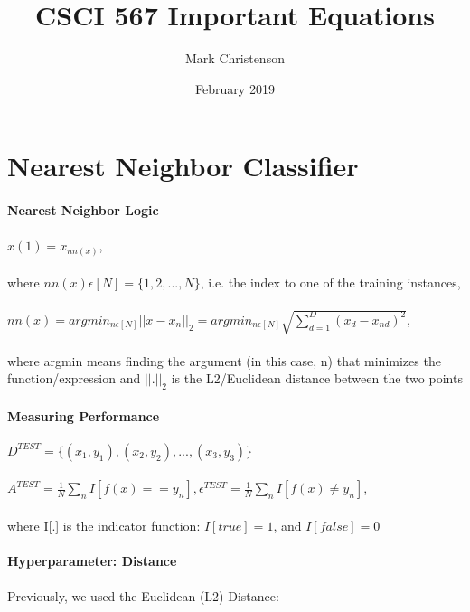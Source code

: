\documentclass{article}
\title{CSCI 567 Important Equations}
\author{Mark Christenson}
\date{February 2019}
\begin{document}
\maketitle

\section{Nearest Neighbor Classifier}
\paragraph{Nearest Neighbor Logic}
\paragraph{}
\(x(1) = x_{nn(x)}\),\\\\
where \(nn(x)\epsilon[N]=\{1,2,...,N\}\), i.e. the index to one of the training instances,
\paragraph{}
\(nn(x) = argmin_{n\epsilon[N]}||x-x_n||_2=argmin_{n\epsilon[N]}\sqrt{\sum_{d=1}^D(x_d-x_{nd})^2}\),\\\\
where argmin means finding the argument (in this case, n) that minimizes the function/expression and \(||.||_2\) is the L2/Euclidean distance between the two points
\paragraph{Measuring Performance}
\paragraph{}
\(D^{TEST}=\{(x_1,y_1),(x_2,y_2),...,(x_3,y_3)\}\)
\paragraph{}
\(A^{TEST}=\frac{1}{N}\sum_nI[f(x)==y_n], \epsilon^{TEST}=\frac{1}{N}\sum_nI[f(x)\neq y_n]\),\\\\
where I[.] is the indicator function: \(I[true] = 1\), and \(I[false] = 0\)
\paragraph{Hyperparameter: Distance}
\paragraph{}
Previously, we used the Euclidean (L2) Distance:
\end{document}
